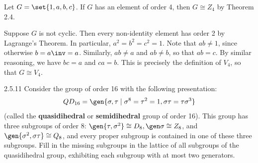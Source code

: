 \begin{sol}[spsol]
    Let $G = \set{1, a, b, c}$.  If $G$ has an element of order 4, then $G \cong Z_4$ by Theorem 2.4.

    Suppose $G$ is not cyclic.
	Then every non-identity element has order 2 by Lagrange's Theorem.
	In particular, $a^2 = b^2 = c^2 = 1$.
	Note that $ab \neq 1$, since otherwise $b = a\inv = a$.
	Similarly, $ab \neq a$ and $ab \neq b$, so that $ab = c$.
	By similar reasoning, we have $bc = a$ and $ca = b$.
	This is precisely the definition of $V_4$, so that $G \cong V_4$.
\end{sol}

\begin{exercise}{2.5.11} 
    Consider the group of order 16 with the following presentation:
    \[
    	QD_{16} = \gen{\sigma, \tau \mid \sigma^8 = \tau^2 = 1, \sigma\tau = \tau\sigma^3}
    \]
    (called the \textbf{quasidihedral} or \textbf{semidihedral} group of order 16).
	This group has three subgroups of order 8: $\gen{\tau, \sigma^2} \cong D_8, \gen \sigma \cong Z_8$, and $\gen{\sigma^2, \sigma\tau} \cong Q_8$, and every proper subgroup is contained in one of these three subgroups.
	Fill in the missing subgroups in the lattice of all subgroups of the quasidihedral group, exhibiting each subgroup with at most two generators.
    \begin{center}
    \end{center}
\end{exercise}

